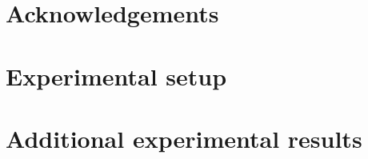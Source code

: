 \documentclass{article}
\begin{document}
\section*{Acknowledgements}




%


\clearpage
\appendix

\section{Experimental setup}
\label{app:setup}


\clearpage
\section{Additional experimental results}
\label{app:extra}

\end{document}
